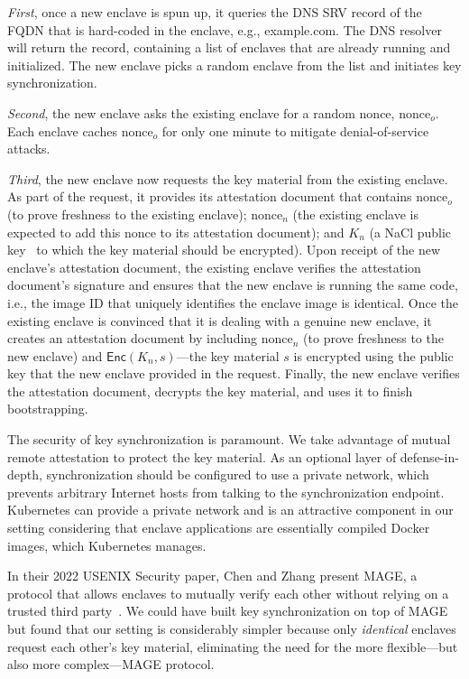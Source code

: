 \emph{First}, once a new enclave is spun up, it queries the DNS SRV record of
the FQDN that is hard-coded in the enclave, e.g., example.com.  The DNS resolver
will return the record, containing a list of enclaves that are already running
and initialized.  The new enclave picks a random enclave from the list and
initiates key synchronization.

\emph{Second}, the new enclave asks the existing enclave for a random nonce,
$\textrm{nonce}_o$.  Each enclave caches $\textrm{nonce}_o$ for only one minute
to mitigate denial-of-service attacks.

\emph{Third}, the new enclave now requests the key material from the existing
enclave.  As part of the request, it provides its attestation document that
contains $\textrm{nonce}_o$ (to prove freshness to the existing enclave);
$\textrm{nonce}_n$ (the existing enclave is expected to add this nonce to its
attestation document); and $K_n$ (a NaCl public key~\cite{nacl} to which the key
material should be encrypted).  Upon receipt of the new enclave's attestation
document, the existing enclave verifies the attestation document's signature and
ensures that the new enclave is running the same code, i.e., the image ID that
uniquely identifies the enclave image is identical.  Once the existing enclave
is convinced that it is dealing with a genuine new enclave, it creates an
attestation document by including $\textrm{nonce}_n$ (to prove freshness to the
new enclave) and $\textsf{Enc}(K_n, s)$---the key material $s$ is encrypted
using the public key that the new enclave provided in the request.  Finally, the
new enclave verifies the attestation document, decrypts the key material, and
uses it to finish bootstrapping.

The security of key synchronization is paramount.  We take advantage of mutual
remote attestation to protect the key material.  As an optional layer of
defense-in-depth, synchronization should be configured to use a private network,
which prevents arbitrary Internet hosts from talking to the synchronization
endpoint.  Kubernetes can provide a private network and is an attractive
component in our setting considering that enclave applications are essentially
compiled Docker images, which Kubernetes manages.

In their 2022 USENIX Security paper, Chen and Zhang present MAGE, a protocol
that allows enclaves to mutually verify each other without relying on a trusted
third party~\cite{Chen2022a}.  We could have built key synchronization on top of
MAGE but found that our setting is considerably simpler because only
\emph{identical} enclaves request each other's key material, eliminating the
need for the more flexible---but also more complex---MAGE protocol.

